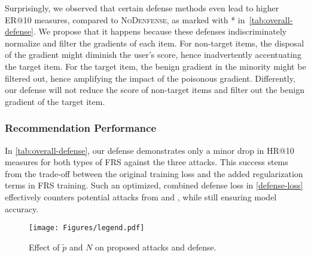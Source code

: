 Surprisingly, we observed that certain defense methods even lead to higher ER@10 measures, compared to \textsc{NoDenfense}, as marked with * in~\cref{tab:overall-defense}.
We propose that it happens because these defenses indiscriminately normalize and filter the gradients of each item.
For non-target items, the disposal of the gradient might diminish the user's score, hence inadvertently accentuating the target item.
For the target item, the benign gradient in the minority might be filtered out, hence amplifying the impact of the poisonous gradient.
Differently, our defense will not reduce the score of non-target items and filter out the benign gradient of the target item. 

\subsubsection{Recommendation Performance}
In \cref{tab:overall-defense}, our defense demonstrates only a minor drop in HR@10 measures for both types of FRS against the three attacks. This success stems from the trade-off between the original training loss and the added regularization terms in FRS training. Such an optimized, combined defense loss in \cref{defense-loss} effectively counters potential attacks from \modelI{} and \modelII{}, while still ensuring model accuracy.

\begin{figure}[tbp]
\centering
     \texttt{[image: Figures/legend.pdf]}%
     \vspace{-0.2cm}
    \vspace{-0.2cm}
    \caption{Effect of $\tilde{p}$ and $N$ on proposed attacks and defense. %
    }
    \label{fig:effect_of_malicious}
\end{figure}
